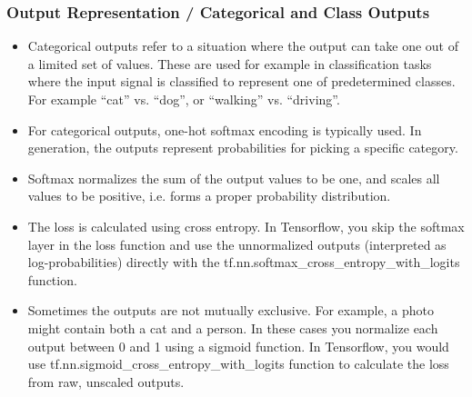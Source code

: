 \documentclass[8pt]{beamer}
\begin{document}
\begin{frame}
\frametitle{Output Representation / Categorical and Class Outputs}
 \begin{itemize}
  \item Categorical outputs refer to a situation where the output can take one out of a limited set of values. These are used for example in classification tasks where
        the input signal is classified to represent one of predetermined classes. For example ``cat'' vs. ``dog'', or ``walking'' vs. ``driving''.
  \item For categorical outputs, one-hot softmax encoding is typically used. In generation, the outputs represent probabilities for picking a specific category.
  \item Softmax normalizes the sum of the output values to be one, and scales all values to be positive, i.e. forms a proper probability distribution.
  \item The loss is calculated using cross entropy. In Tensorflow, you skip the softmax layer in the loss function and use the unnormalized outputs (interpreted as log-probabilities)
        directly with the tf.nn.softmax\_cross\_entropy\_with\_logits function.
  \item Sometimes the outputs are not mutually exclusive. For example, a photo might contain both a cat and a person. In these cases you normalize each output
        between 0 and 1 using a sigmoid function. In Tensorflow, you would use tf.nn.sigmoid\_cross\_entropy\_with\_logits function to calculate the loss from raw, unscaled outputs.
 \end{itemize}
\end{frame}
\end{document}
